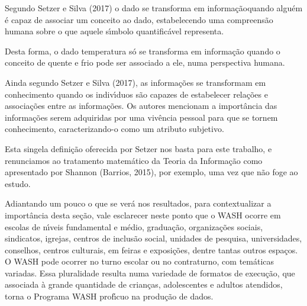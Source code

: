 \documentclass[
12pt,		%
openright,	%
twoside,  %
a4paper,			%
chapter=TITLE,		%
english,			%
french,				%
spanish,			%
brazil				%
]{USPSC-classe/USPSC}
\begin{document}
Segundo Setzer e Silva (2017) o dado se transforma em \textquotedbl informa\c{c}\~ao\textquotedbl  quando algu\'em \'e capaz de associar um conceito ao dado, estabelecendo uma compreens\~ao humana sobre o que aquele s\'{\i}mbolo quantific\'avel representa.








Desta forma, o dado \textquotedbl  temperatura \textquotedbl  s\'o se transforma em informa\c{c}\~ao quando o conceito de \textquotedbl  quente \textquotedbl  e \textquotedbl  frio \textquotedbl  pode ser associado a ele, numa perspectiva humana.








Ainda segundo Setzer e Silva (2017), as informa\c{c}\~oes se transformam em conhecimento quando os indiv\'{\i}duos s\~ao capazes de estabelecer rela\c{c}\~oes e associa\c{c}\~oes entre as informa\c{c}\~oes. Os autores mencionam a import\^ancia das informa\c{c}\~oes serem adquiridas por uma viv\^encia pessoal para que se tornem conhecimento, caracterizando-o como um atributo subjetivo.








Esta singela defini\c{c}\~ao oferecida por Setzer nos basta para este trabalho, e renunciamos ao tratamento matem\'atico da Teoria da Informa\c{c}\~ao como apresentado por Shannon (Barrios, 2015), por exemplo, uma vez que n\~ao foge ao estudo.








Adiantando um pouco o que se ver\'a nos resultados, para contextualizar a import\^ancia desta se\c{c}\~ao, vale esclarecer neste ponto que o WASH ocorre  em escolas de n\'{\i}veis fundamental e m\'edio, gradua\c{c}\~ao, organiza\c{c}\~oes sociais, sindicatos, igrejas, centros de inclus\~ao social, unidades de pesquisa, universidades,  conselhos, centros culturais, em feiras e exposi\c{c}\~oes, dentre tantas outros espa\c{c}os. O WASH pode ocorrer no turno escolar ou no contraturno, com tem\'aticas variadas.  Essa pluralidade resulta numa variedade de formatos de execu\c{c}\~ao, que associada \`a grande quantidade de crian\c{c}as, adolescentes e adultos atendidos, torna o Programa WASH prof\'{\i}cuo na produ\c{c}\~ao de dados.
\end{document}
